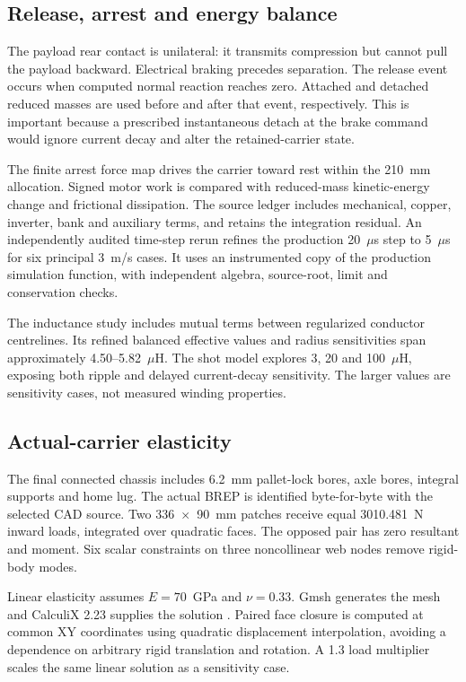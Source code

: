 \documentclass[conference,a4paper]{IEEEtran}
\begin{document}
\subsection{Release, arrest and energy balance}
The payload rear contact is unilateral: it transmits compression but cannot pull the payload backward. Electrical braking precedes separation. The release event occurs when computed normal reaction reaches zero. Attached and detached reduced masses are used before and after that event, respectively. This is important because a prescribed instantaneous detach at the brake command would ignore current decay and alter the retained-carrier state.

The finite arrest force map drives the carrier toward rest within the 210~mm allocation. Signed motor work is compared with reduced-mass kinetic-energy change and frictional dissipation. The source ledger includes mechanical, copper, inverter, bank and auxiliary terms, and retains the integration residual. An independently audited time-step rerun refines the production 20~$\mu$s step to 5~$\mu$s for six principal 3~m/s cases. It uses an instrumented copy of the production simulation function, with independent algebra, source-root, limit and conservation checks.

The inductance study includes mutual terms between regularized conductor centrelines. Its refined balanced effective values and radius sensitivities span approximately 4.50--5.82~$\mu$H. The shot model explores 3, 20 and 100~$\mu$H, exposing both ripple and delayed current-decay sensitivity. The larger values are sensitivity cases, not measured winding properties.

\subsection{Actual-carrier elasticity}
The final connected chassis includes 6.2~mm pallet-lock bores, axle bores, integral supports and home lug. The actual BREP is identified byte-for-byte with the selected CAD source. Two 336~$\times$~90~mm patches receive equal 3010.481~N inward loads, integrated over quadratic faces. The opposed pair has zero resultant and moment. Six scalar constraints on three noncollinear web nodes remove rigid-body modes.

Linear elasticity assumes $E=70$~GPa and $\nu=0.33$. Gmsh generates the mesh and CalculiX 2.23 supplies the solution \cite{gmsh,ccx}. Paired face closure is computed at common XY coordinates using quadratic displacement interpolation, avoiding a dependence on arbitrary rigid translation and rotation. A 1.3 load multiplier scales the same linear solution as a sensitivity case.
\end{document}
